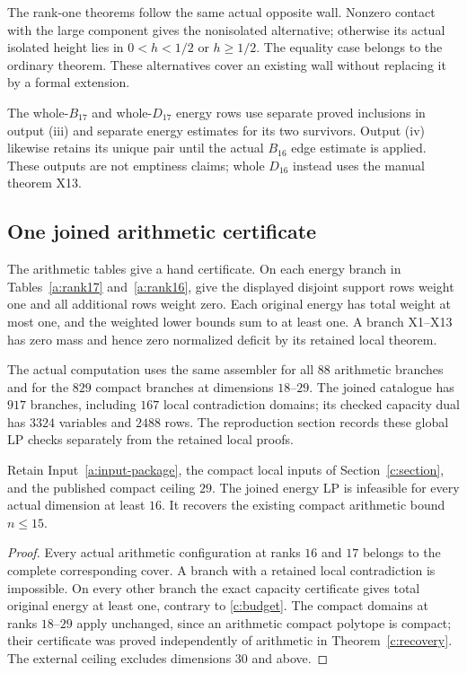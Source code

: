 The rank-one theorems follow the same actual opposite wall. Nonzero
contact with the large component gives the nonisolated alternative;
otherwise its actual isolated height lies in $0<h<1/2$ or $h\ge1/2$.
The equality case belongs to the ordinary theorem. These alternatives
cover an existing wall without replacing it by a formal extension.

The whole-$B_{17}$ and whole-$D_{17}$ energy rows use separate proved
inclusions in output (iii) and separate energy estimates for its two
survivors. Output (iv) likewise retains its unique pair until the actual
$B_{16}$ edge estimate is applied. These outputs are not emptiness
claims; whole $D_{16}$ instead uses the manual theorem X13.

\subsection{One joined arithmetic certificate}
\label{a:certificate}

The arithmetic tables give a hand certificate. On each energy branch in
Tables~\ref{a:rank17} and~\ref{a:rank16}, give the displayed disjoint
support rows weight one and all additional rows weight zero. Each
original energy has total weight at most one, and the weighted lower
bounds sum to at least one. A branch X1--X13 has zero mass and hence
zero normalized deficit by its retained local theorem.

The actual computation uses the same assembler for all $88$ arithmetic
branches and for the $829$ compact branches at dimensions $18$--$29$.
The joined catalogue has $917$ branches, including $167$ local
contradiction domains; its checked capacity dual has $3324$ variables
and $2488$ rows. The reproduction section records these global LP
checks separately from the retained local proofs.

\begin{theorem}\label{a:recovery}
Retain Input~\ref{a:input-package}, the compact local inputs of
Section~\ref{c:section}, and the published compact ceiling $29$.
The joined energy LP is infeasible for every actual dimension at least
$16$. It recovers the existing compact arithmetic bound $n\le15$.
\end{theorem}
\begin{proof}
Every actual arithmetic configuration at ranks $16$ and $17$ belongs
to the complete corresponding cover. A branch with a retained local
contradiction is impossible. On every other branch the exact capacity
certificate gives total original energy at least one, contrary to
\eqref{c:budget}. The compact domains at ranks $18$--$29$ apply unchanged,
since an arithmetic compact polytope is compact; their certificate was
proved independently of arithmetic in Theorem~\ref{c:recovery}.
The external ceiling excludes dimensions $30$ and above.
\end{proof}

